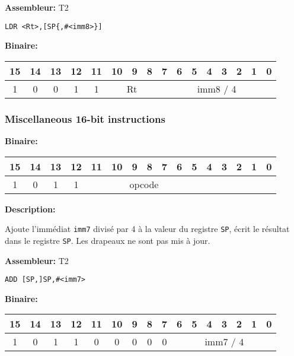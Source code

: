 \documentclass{article}
\begin{document}
    \textbf{Assembleur:} T2

    \begin{lstlisting}
LDR <Rt>,[SP{,#<imm8>}]
    \end{lstlisting}

    \textbf{Binaire:}

    \begin{tabular}{| c c c c c c c c c c c c c c c c |}
        \hline
        15 & 14 & 13 & 12 & \multicolumn{1}{|c}{11} & \multicolumn{1}{|c}{10} & 9 & 8 & \multicolumn{1}{|c}{7} & 6 & 5 & 4 & 3 & 2 & 1 & 0 \\
        \hline
        1 & 0 & 0 & 1 & \multicolumn{1}{|c}{1} & \multicolumn{3}{|c}{Rt} & \multicolumn{8}{|c|}{imm8 / 4} \\
        \hline
    \end{tabular}

    \subsubsection{Miscellaneous 16-bit instructions}
    \label{subsubsec:MiscInstr}

    \textbf{Binaire:}

    \begin{tabular}{| c c c c c c c c c c c c c c c c |}
        \hline
        15 & 14 & 13 & 12 & \multicolumn{1}{|c}{11} & 10 & 9 & 8 & 7 & 6 & 5 & \multicolumn{1}{|c}{4} & 3 & 2 & 1 & 0 \\
        \hline
        1 & 0 & 1 & 1 & \multicolumn{7}{|c}{opcode} & \multicolumn{5}{|c|}{} \\
        \hline
    \end{tabular}


    \textbf{Description: }

    Ajoute l'immédiat \texttt{imm7} divisé par 4 à la valeur du registre \texttt{SP}, écrit le résultat dans le registre \texttt{SP}.
    Les drapeaux ne sont pas mis à jour.

    \textbf{Assembleur:} T2

    \begin{lstlisting}
ADD [SP,]SP,#<imm7>
    \end{lstlisting}

    \textbf{Binaire:}

    \begin{tabular}{| c c c c c c c c c c c c c c c c |}
        \hline
        15 & 14 & 13 & 12 & \multicolumn{1}{|c}{11} & 10 & 9 & 8 & \multicolumn{1}{|c}{7} & \multicolumn{1}{|c}{6} & 5 & 4 & 3 & 2 & 1 & 0 \\
        \hline
        1 & 0 & 1 & 1 & \multicolumn{1}{|c}{0} & 0 & 0 & 0 & \multicolumn{1}{|c}{0} & \multicolumn{7}{|c|}{imm7 / 4} \\
        \hline
    \end{tabular}
\end{document}
